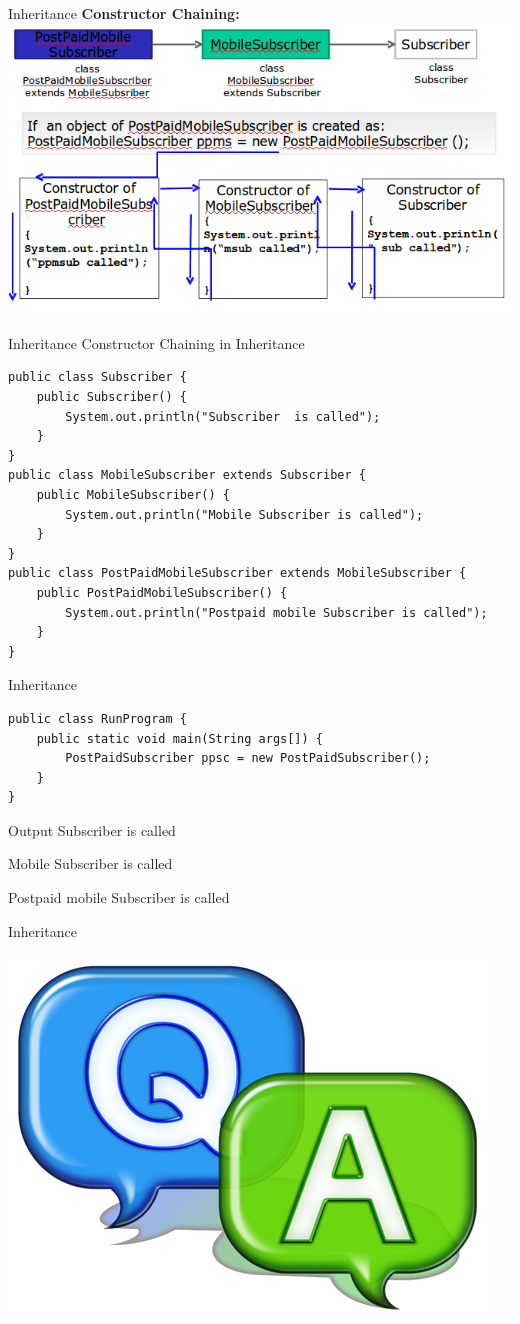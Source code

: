 \documentclass[14pt]{beamer}
\begin{document}
\begin{frame}{Inheritance}
 \textbf{Constructor  Chaining:}
 \includegraphics[scale=.5]{constructor-chaining.png}
\end{frame}


\begin{frame}[fragile]{Inheritance}
 Constructor Chaining in Inheritance
 \begin{lstlisting}[numbers=none, basicstyle=\tiny]
public class Subscriber {
    public Subscriber() {
        System.out.println("Subscriber  is called");
    }
}
public class MobileSubscriber extends Subscriber {
    public MobileSubscriber() {
        System.out.println("Mobile Subscriber is called");
    }
}
public class PostPaidMobileSubscriber extends MobileSubscriber {
    public PostPaidMobileSubscriber() {
        System.out.println("Postpaid mobile Subscriber is called");
    }
}
 \end{lstlisting}
\end{frame}

\begin{frame}[fragile]{Inheritance}
\begin{lstlisting}[numbers=none]
public class RunProgram {
    public static void main(String args[]) {
        PostPaidSubscriber ppsc = new PostPaidSubscriber();
    }
}
\end{lstlisting}
\begin{block}{Output}
Subscriber  is called

Mobile Subscriber is called

Postpaid mobile Subscriber is called
\end{block}
\end{frame}


\begin{frame}{Inheritance}
\begin{center}
    \includegraphics[scale=0.5]{qa.png}
  \end{center}
  \end{frame}
\end{document}
